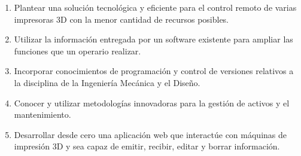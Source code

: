 \begin{enumerate}
	\item Plantear una solución tecnológica y eficiente para el control remoto de varias impresoras 3D con la menor cantidad de recursos posibles.
	\item Utilizar la información entregada por un software existente para ampliar las funciones que un operario realizar.
	\item Incorporar conocimientos de programación y control de versiones relativos a la disciplina de la Ingeniería Mecánica y el Diseño.
	\item Conocer y utilizar metodologías innovadoras para la gestión de activos y el mantenimiento.
	\item Desarrollar desde cero una aplicación web que interactúe con máquinas de impresión 3D y sea capaz de emitir, recibir, editar y borrar información.   
\end{enumerate} 
\clearpage





